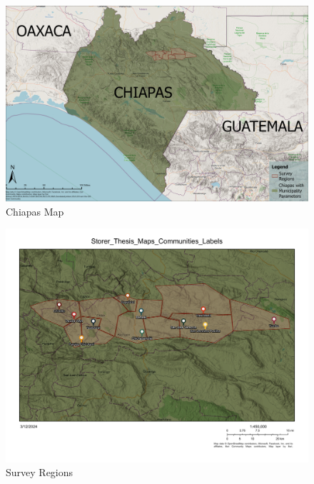 \documentclass[../main.tex]{subfiles}
\begin{document}
%









%

%


\begin{figure}[h!]
    \centering
    \caption{Chiapas Map}
    \label{fig:map_chiapas_map}    \includegraphics[width=1\textwidth]{project/figures/map_chiapas.jpg}
\end{figure}

\begin{figure}[h!]
    \centering
    \caption{Survey Regions}
    \label{fig:map_survey_regions}    \includegraphics[width=1\textwidth]{project/figures/map_communities.pdf}
\end{figure}
\end{document}
